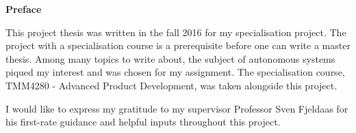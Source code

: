 \vspace*{\fill}
{\centering\huge\bfseries Preface \par}
\noindent This project thesis was written in the fall 2016 for my specialisation project. The project with a specialisation course is a prerequisite before one can write a master thesis. Among many topics to write about, the subject of autonomous systems piqued my interest and was chosen for my assignment. The specialisation course, TMM4280 - Advanced Product Development, was taken alongside this project.

I would like to express my gratitude to my supervisor Professor Sven Fjeldaas for his first-rate guidance and helpful inputs throughout this project.

\vspace*{\fill}